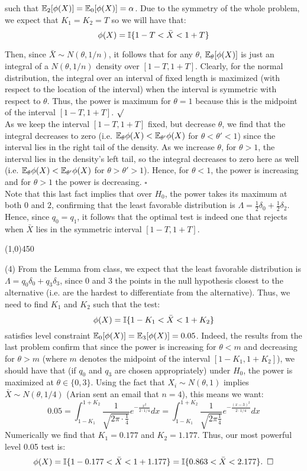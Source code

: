 \documentclass[12pt]{article}
\begin{document}
\noindent
such that $\mathbb{E}_2[\phi(X)] = \mathbb{E}_0[\phi(X)] = \alpha$. Due to the symmetry of the whole problem, we expect that $K_1 = K_2 = T$ so we will have that:
$$\phi(X) = \mathbb{I}\{ 1-T < \bar{X} < 1+T\}$$

\noindent
Then, since $\bar{X} \sim N(\theta,1/n)$, it follows that for any $\theta$, $\mathbb{E}_\theta[\phi(X)]$ is just an integral of a $N(\theta,1/n)$ density over $[1-T, 1+T]$. Clearly, for the normal distribution, the integral over an interval of fixed length is maximized (with respect to the location of the interval) when the interval is symmetric with respect to $\theta$. Thus, the power is maximum for $\theta = 1$ because this is the midpoint of the interval $[1-T, 1+T]$. $\surd$\\

\noindent
As we keep the interval $[1-T,1+T]$ fixed, but decrease $\theta$, we find that the integral decreases to zero (i.e. $\mathbb{E}_\theta\phi(X) < \mathbb{E}_{\theta'}\phi(X)$ for $\theta < \theta' < 1$) since the interval lies in the right tail of the density. As we increase $\theta$, for $\theta>1$, the interval lies in the density's left tail, so the integral decreases to zero here as well (i.e. $\mathbb{E}_\theta\phi(X) < \mathbb{E}_{\theta'}\phi(X)$ for $\theta > \theta' > 1$). Hence, for $\theta < 1$, the power is increasing and for $\theta >1$ the power is decreasing. $\square$\\

\noindent
Note that this last fact implies that over $H_0$, the power takes its maximum at both $0$ and $2$, confirming that the least favorable distribution is $\Lambda = \frac{1}{2} \delta_0 + \frac{1}{2} \delta_2$. Hence, since $q_0=q_1$, it follows that the optimal test is indeed one that rejects when $\bar{X}$ lies in the symmetric interval $[1-T,1+T]$.
 \begin{center}
\line(1,0){450}
\end{center}

\noindent
(4) From the Lemma from class, we expect that the least favorable distribution is $\Lambda = q_0 \delta_0 + q_3 \delta_3$, since 0 and 3 the points in the null hypothesis closest to the alternative (i.e. are the hardest to differentiate from the alternative). Thus, we need to find $K_1$ and $K_2$ such that the test:
$$\phi(X) = \mathbb{I}\{ 1-K_1 < \bar{X} < 1+K_2\}$$
satisfies level constraint $\mathbb{E}_0[\phi(X)] = \mathbb{E}_3[\phi(X)] = 0.05$.  Indeed, the results from the last problem confirm that since the power is increasing for $\theta < m$ and decreasing for $\theta > m$ (where $m$ denotes the midpoint of the interval $[1-K_1,1+K_2]$), we should have that (if $q_0$ and $q_3$ are chosen appropriately) under $H_0$, the power is maximized at $\theta\in\{0,3\}$.  Using the fact that $X_i \sim N(\theta,1)$ implies $\bar{X} \sim N(\theta,1/4)$ (Arian sent an email that $n=4$), this means we want:
$$0.05 = \int_{1-K_1}^{1+K_2} \frac{1}{\sqrt{2\pi \cdot\frac{1}{4} }}e^{-\frac{x^2}{2\cdot 1/4}} dx
=  \int_{1-K_1}^{1+K_2} \frac{1}{\sqrt{2\pi \frac{1}{4} }}e^{-\frac{(x-3)^2}{2\cdot 1/4}} dx$$
Numerically we find that $K_1 = 0.177$ and $K_2 = 1.177$. Thus, our most powerful level 0.05 test is:
$$\phi(X) = \mathbb{I}\{ 1-0.177 < \bar{X} < 1+1.177\}
= \mathbb{I}\{ 0.863 < \bar{X} < 2.177\}. \hspace{5 pt} \square$$
\end{document}
